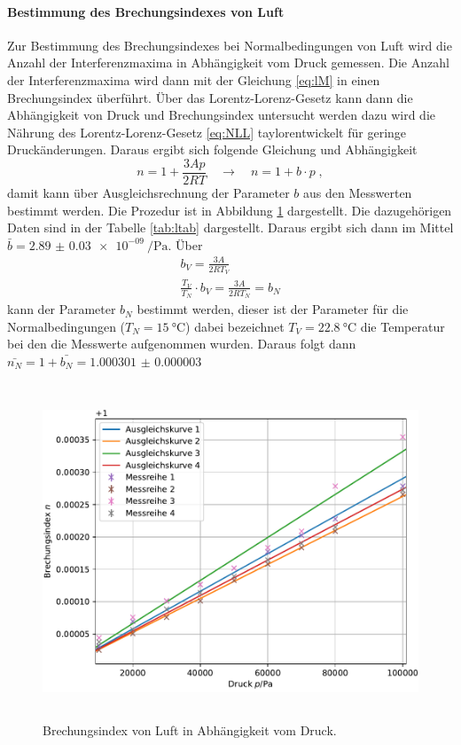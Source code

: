 \paragraph{Bestimmung des Brechungsindexes von Luft}
Zur Bestimmung des Brechungsindexes bei Normalbedingungen von Luft wird die Anzahl der Interferenzmaxima 
in Abhängigkeit vom Druck gemessen. Die Anzahl der Interferenzmaxima wird dann mit der Gleichung 
\eqref{eq:lM} in einen Brechungsindex überführt. Über das Lorentz-Lorenz-Gesetz kann dann die 
Abhängigkeit von Druck und Brechungsindex untersucht werden dazu wird die Nährung des Lorentz-Lorenz-Gesetz 
\eqref{eq:NLL} taylorentwickelt für geringe Druckänderungen. 
Daraus ergibt sich folgende Gleichung und Abhängigkeit
\begin{equation}
n = 1 + \frac{3Ap}{2RT} \quad \rightarrow \quad n = 1+ b \cdot p \; ,
\label{eq:brechl}
\end{equation}
damit kann über Ausgleichsrechnung der Parameter $b$ aus den Messwerten bestimmt werden. 
Die Prozedur ist in Abbildung \ref{fig:Lplot} dargestellt. 
Die dazugehörigen Daten sind in der Tabelle \ref{tab:ltab} dargestellt. 
Daraus ergibt sich dann im Mittel $ \bar{b} = \SI{2.89(3)e-09}{\per\Pa}$. 
Über 
\begin{gather}
b_V =  \frac{3A}{2RT_V} \\
\frac{T_V}{T_N} \cdot b_V =\frac{3A}{2RT_N} = b_N
\end{gather}
kann der Parameter $b_N$ bestimmt werden, dieser ist der Parameter für die Normalbedingungen 
($T_N = \SI{15}{\celsius}$) dabei bezeichnet $T_V = \SI{22,8}{\celsius}$ die Temperatur bei den die 
Messwerte aufgenommen wurden. 
Daraus folgt dann $ \bar{n_{N}} = 1 +  \bar{b_{N}} = \SI{1.000301(3)}{}$
\begin{figure}
  \centering
  \includegraphics[height = 10cm]{plots/Luftplot.pdf}
  \caption{Brechungsindex von Luft in Abhängigkeit vom Druck.}
  \label{fig:Lplot}
\end{figure}

